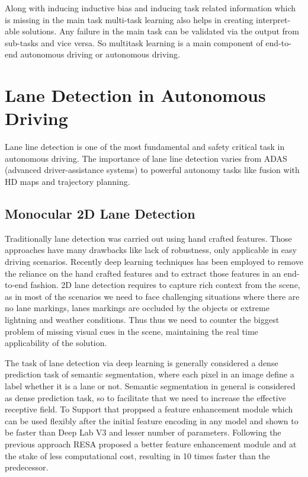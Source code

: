     Along with inducing inductive bias and inducing task related information which is missing in the main task multi-task learning also helps in creating interpret-able solutions. Any failure in the main task can be validated via the output from sub-tasks and vice versa. So multitask learning is a main component of end-to-end autonomous driving or autonomous driving.  

    \section{Lane Detection in Autonomous Driving}
    Lane line detection is one of the most fundamental and safety critical task in autonomous driving. The importance of lane line detection varies from ADAS (advanced driver-assistance systems) to powerful autonomy tasks like fusion with HD maps and trajectory planning.
        \subsection{Monocular 2D Lane Detection}
        Traditionally lane detection was carried out using hand crafted features. Those approaches have many drawbacks like lack of robustness, only applicable in easy driving scenarios. Recently deep learning techniques has been employed to remove the reliance on the hand crafted features and to extract those features in an end-to-end fashion. 2D lane detection requires to capture rich context from the scene, as in most of the scenarios we need to face challenging situations where there are no lane markings, lanes markings are occluded by the objects or extreme lightning and weather conditions. Thus thus we need to counter the biggest problem of missing visual cues in the scene, maintaining the real time applicability of the solution.
        
        The task of lane detection via deep learning is generally considered a dense prediction task of semantic segmentation, where each pixel in an image define a label whether it is a lane or not. Semantic segmentation in general is considered as dense prediction task, so to facilitate that we need to increase the effective receptive field. To Support that \cite{DBLP:journals/corr/abs-1712-06080} proppsed a feature enhancement module which can be used flexibly after the initial feature encoding in any model and shown to be faster than Deep Lab V3 \cite{DBLP:journals/corr/ChenPSA17} and lesser number of parameters. Following the previous approach RESA \cite{DBLP:journals/corr/abs-2008-13719} proposed a better feature enhancement module and at the stake of less computational cost, resulting in 10 times faster than the predecessor. 
        
